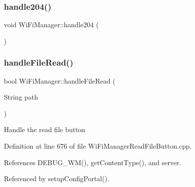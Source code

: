 \subsubsection{\texorpdfstring{handle204()}{handle204()}}
{\footnotesize\ttfamily void Wi\+Fi\+Manager\+::handle204 (\begin{DoxyParamCaption}{ }\end{DoxyParamCaption})\hspace{0.3cm}{\ttfamily [private]}}

\mbox{\label{class_wi_fi_manager_a9e802fa4ca834a622f058a7176f47806}} 
\subsubsection{\texorpdfstring{handle\+File\+Read()}{handleFileRead()}}
{\footnotesize\ttfamily bool Wi\+Fi\+Manager\+::handle\+File\+Read (\begin{DoxyParamCaption}\item[{String}]{path }\end{DoxyParamCaption})\hspace{0.3cm}{\ttfamily [private]}}

Handle the read file button 

Definition at line 676 of file Wi\+Fi\+Manager\+Read\+File\+Button.\+cpp.



References D\+E\+B\+U\+G\+\_\+\+W\+M(), get\+Content\+Type(), and server.



Referenced by setup\+Config\+Portal().

